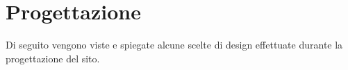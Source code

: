 \section{Progettazione}

Di seguito vengono viste e spiegate alcune scelte di design effettuate durante la progettazione del sito.
